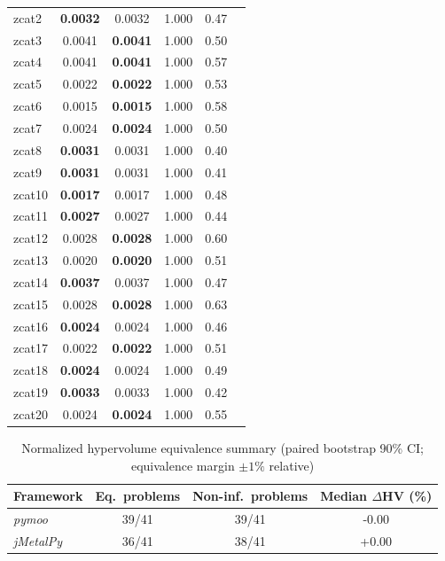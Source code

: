 \documentclass[journal]{IEEEtran}
\newcommand{\xmark}{\ding{55}}
\begin{document}
\begin{table}[htbp]
\begin{tabular}{lccccc}
zcat2 & \textbf{0.0032} & 0.0032 & 1.000 & 0.47 &  \xmark \\
zcat3 & 0.0041 & \textbf{0.0041} & 1.000 & 0.50 &  \xmark \\
zcat4 & 0.0041 & \textbf{0.0041} & 1.000 & 0.57 &  \xmark \\
zcat5 & 0.0022 & \textbf{0.0022} & 1.000 & 0.53 &  \xmark \\
zcat6 & 0.0015 & \textbf{0.0015} & 1.000 & 0.58 &  \xmark \\
zcat7 & 0.0024 & \textbf{0.0024} & 1.000 & 0.50 &  \xmark \\
zcat8 & \textbf{0.0031} & 0.0031 & 1.000 & 0.40 &  \xmark \\
zcat9 & \textbf{0.0031} & 0.0031 & 1.000 & 0.41 &  \xmark \\
zcat10 & \textbf{0.0017} & 0.0017 & 1.000 & 0.48 &  \xmark \\
zcat11 & \textbf{0.0027} & 0.0027 & 1.000 & 0.44 &  \xmark \\
zcat12 & 0.0028 & \textbf{0.0028} & 1.000 & 0.60 &  \xmark \\
zcat13 & 0.0020 & \textbf{0.0020} & 1.000 & 0.51 &  \xmark \\
zcat14 & \textbf{0.0037} & 0.0037 & 1.000 & 0.47 &  \xmark \\
zcat15 & 0.0028 & \textbf{0.0028} & 1.000 & 0.63 &  \xmark \\
zcat16 & \textbf{0.0024} & 0.0024 & 1.000 & 0.46 &  \xmark \\
zcat17 & 0.0022 & \textbf{0.0022} & 1.000 & 0.51 &  \xmark \\
zcat18 & \textbf{0.0024} & 0.0024 & 1.000 & 0.49 &  \xmark \\
zcat19 & \textbf{0.0033} & 0.0033 & 1.000 & 0.42 &  \xmark \\
zcat20 & 0.0024 & \textbf{0.0024} & 1.000 & 0.55 &  \xmark \\
\bottomrule
\end{tabular}
\end{table}

\begin{table}[htbp]
\centering
\caption{Normalized hypervolume equivalence summary (paired bootstrap 90\% CI; equivalence margin $\pm 1\%$ relative)}
\label{tab:hv_equivalence_summary_smsemoa}
\begin{tabular}{lccc}
\toprule
\textbf{Framework} & \textbf{Eq.\ problems} & \textbf{Non-inf.\ problems} & \textbf{Median $\Delta$HV (\%)} \\
\midrule
\textit{pymoo} & 39/41 & 39/41 & -0.00 \\
\textit{jMetalPy} & 36/41 & 38/41 & +0.00 \\
\bottomrule
\end{tabular}
\end{table}
\end{document}
